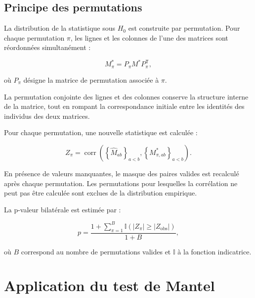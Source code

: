 \documentclass[11pt,a4paper]{report}
\begin{document}
\subsection*{Principe des permutations}

La distribution de la statistique sous $H_0$ est construite par
permutation. Pour chaque permutation $\pi$, les lignes et les colonnes
de l'une des matrices sont réordonnées simultanément :

\begin{equation}
    M^*_{\pi}
    =
    P_{\pi} M^* P_{\pi}^{\mathsf{T}},
\end{equation}

où $P_{\pi}$ désigne la matrice de permutation associée à $\pi$.

La permutation conjointe des lignes et des colonnes conserve la
structure interne de la matrice, tout en rompant la correspondance
initiale entre les identités des individus des deux matrices.

Pour chaque permutation, une nouvelle statistique est calculée :

\begin{equation}
    Z_{\pi}
    =
    \operatorname{corr}
    \left(
    \left\{\widehat{M}_{ab}\right\}_{a<b},
    \left\{M^*_{\pi,ab}\right\}_{a<b}
    \right).
\end{equation}

En présence de valeurs manquantes, le masque des paires valides est
recalculé après chaque permutation. Les permutations pour lesquelles la
corrélation ne peut pas être calculée sont exclues de la distribution
empirique.

La p-valeur bilatérale est estimée par :

\begin{equation}
    p
    =
    \frac{
        1+
        \displaystyle\sum_{\pi=1}^{B}
        \mathbb{I}
        \left(
        \left|Z_{\pi}\right|
        \geq
        \left|Z_{\mathrm{obs}}\right|
        \right)
    }{
        1+B
    },
\end{equation}

où $B$ correspond au nombre de permutations valides et
$\mathbb{I}$ à la fonction indicatrice.


\section{Application du test de Mantel}
\label{sec:application_mantel}
\end{document}
